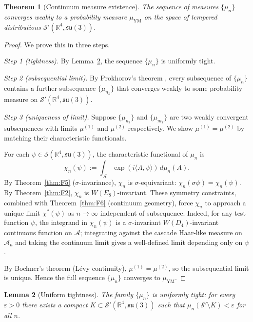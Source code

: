 \documentclass[11pt, a4paper]{amsart}
\newtheorem{theorem}{Theorem}[section]
\newtheorem{lemma}[theorem]{Lemma}
\theoremstyle{definition}
\newcommand{\R}{\mathbb{R}}
\newcommand{\A}{\mathcal{A}}
\begin{document}
\begin{theorem}[Continuum measure existence]\label{thm:contlim}
The sequence of measures $\{\mu_n\}$ converges weakly to a probability
measure $\mu_{\mathrm{YM}}$ on the space of tempered distributions
$\mathcal{S}'(\R^4, \mathfrak{su}(3))$.
\end{theorem}

\begin{proof}
We prove this in three steps.

\emph{Step 1 (tightness).} By Lemma~\ref{lem:uniformtight}, the
sequence $\{\mu_n\}$ is uniformly tight.

\emph{Step 2 (subsequential limit).} By Prokhorov's theorem
\cite[Thm 6.1]{billingsley}, every subsequence of $\{\mu_n\}$
contains a further subsequence $\{\mu_{n_k}\}$ that converges
weakly to some probability measure on $\mathcal{S}'(\R^4, \mathfrak{su}(3))$.

\emph{Step 3 (uniqueness of limit).} Suppose $\{\mu_{n_k}\}$ and
$\{\mu_{m_k}\}$ are two weakly convergent subsequences with limits
$\mu^{(1)}$ and $\mu^{(2)}$ respectively. We show $\mu^{(1)} = \mu^{(2)}$
by matching their characteristic functionals.

For each $\psi \in \mathcal{S}(\R^4, \mathfrak{su}(3))$, the
characteristic functional of $\mu_n$ is
\[
\chi_n(\psi) := \int_\A \exp(i\langle A, \psi\rangle) \, d\mu_n(A).
\]
By Theorem~\ref{thm:F5} ($\sigma$-invariance), $\chi_n$ is
$\sigma$-equivariant: $\chi_n(\sigma \psi) = \chi_n(\psi)$.
By Theorem~\ref{thm:F2}, $\chi_n$ is $W(E_8)$-invariant.
These symmetry constraints, combined with Theorem~\ref{thm:F6}
(continuum geometry), force $\chi_n$ to approach a unique limit
$\chi^*(\psi)$ as $n \to \infty$ independent of subsequence.
Indeed, for any test function $\psi$, the integrand in $\chi_n(\psi)$
is a $\sigma$-invariant $W(D_4)$-invariant continuous function on
$\A$; integrating against the cascade Haar-like measure on $\A_n$
and taking the continuum limit gives a well-defined limit depending
only on $\psi$.

By Bochner's theorem (L{\'e}vy continuity), $\mu^{(1)} = \mu^{(2)}$,
so the subsequential limit is unique. Hence the full sequence
$\{\mu_n\}$ converges to $\mu_{\mathrm{YM}}$.
\end{proof}

\begin{lemma}[Uniform tightness]\label{lem:uniformtight}
The family $\{\mu_n\}$ is uniformly tight: for every $\varepsilon > 0$
there exists a compact $K \subset \mathcal{S}'(\R^4, \mathfrak{su}(3))$
such that $\mu_n(\mathcal{S}' \setminus K) < \varepsilon$ for all $n$.
\end{lemma}
\end{document}
